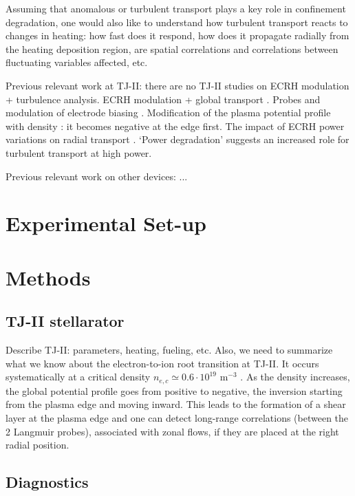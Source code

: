 \documentclass[preprint,12pt,authoryear]{elsarticle}
\begin{document}
Assuming that anomalous or turbulent transport plays a key role in confinement degradation, one would also like to understand how turbulent transport reacts to changes in heating: how fast does it respond, how does it propagate radially from the heating deposition region, are spatial correlations and correlations between fluctuating variables affected, etc. 

Previous relevant work at TJ-II: there are no TJ-II studies on ECRH modulation + turbulence analysis. 
ECRH modulation + global transport \cite{S_Eguilior_2003}. 
Probes and modulation of electrode biasing \cite{Grenfell:2019}. 
Modification of the plasma potential profile with density \cite{Melnikov:2011}: it becomes negative at the edge first.
The impact of ECRH power variations on radial transport \cite{Milligen:2018b}. `Power degradation' suggests an increased role for turbulent transport at high power. 

Previous relevant work on other devices: ...

\section{Experimental Set-up}

\section{Methods}

\subsection{TJ-II stellarator}

Describe TJ-II: parameters, heating, fueling, etc. Also, we need to summarize what we know about the electron-to-ion root transition at TJ-II. 
It occurs systematically at a critical density $n_{e,c} \simeq 0.6 \cdot 10^{19}$ m$^{-3}$
\cite{Hidalgo:2006b} \cite{Pedrosa:2008}.
As the density increases, the global potential profile goes from positive to negative, the inversion starting from the plasma edge and moving inward. This leads to the formation of a shear layer at the plasma edge and one can detect long-range correlations (between the 2 Langmuir probes), associated with zonal flows, if they are placed at the right radial position.

\subsection{Diagnostics}
\end{document}
